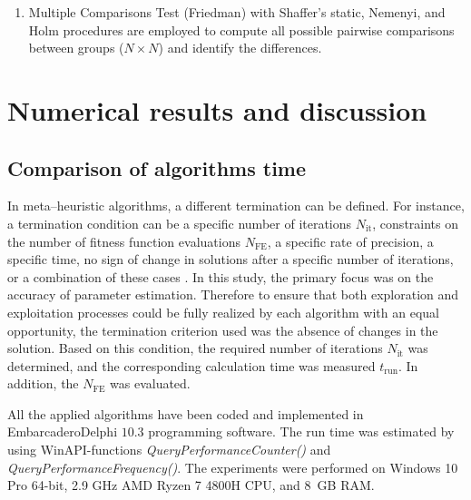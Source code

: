 \documentclass[a4paper,fleqn]{cas-sc}
\begin{document}
\begin{enumerate}[1.]
\item
Multiple Comparisons Test (Friedman) with Shaffer’s static, Nemenyi, and Holm procedures
are employed to compute all possible pairwise comparisons between groups ($N\times N$)
and identify the differences.

\end{enumerate}




\section{Numerical results and discussion}\label{Result}

\subsection{Comparison of algorithms time}
In meta--heuristic algorithms, a different termination can be defined.
For instance, a termination condition can be a specific number of iterations $N_\mathrm{it}$,
constraints on the number of fitness function evaluations $N_\mathrm{FE}$,
a specific rate of precision,
a specific time,
no sign of change in solutions after a specific number of iterations,
or a combination of these cases \cite{IntelligentChaoticClonal}.
In this study, the primary focus was on the accuracy of parameter estimation.
Therefore to ensure that both exploration and exploitation processes could be fully realized
by each algorithm with an equal opportunity, the termination criterion used was the absence of changes in the solution.
Based on this condition, the required number of iterations $N_\mathrm{it}$ was determined,
and the corresponding calculation time was measured $t_\mathrm{run}$.
In addition, the $N_\mathrm{FE}$ was evaluated.

All the applied algorithms have been coded and implemented in Embarcadero\textregistered Delphi $10.3$ programming software.
The run time was estimated by using WinAPI-functions \emph{QueryPerformanceCounter()} and \emph{QueryPerformanceFrequency()}.
The experiments were performed on Windows 10 Pro 64-bit,
2.9 GHz AMD Ryzen 7 4800H CPU, and 8~GB RAM.

\end{document}
